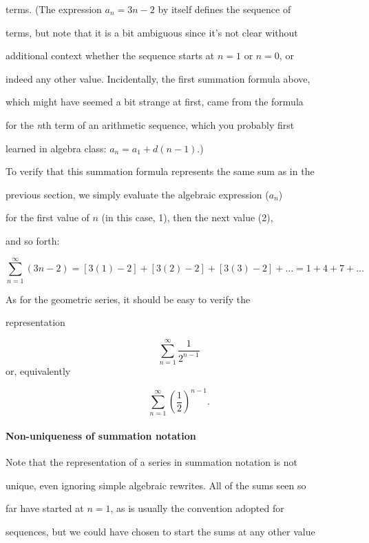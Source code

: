 terms. (The expression $a _n=3n-2$ by itself defines the sequence of

terms, but note that it is a bit ambiguous since it's not clear without

additional context whether the sequence starts at $n=1$ or $n=0$, or

indeed any other value. Incidentally, the first summation formula above,

which might have seemed a bit strange at first, came from the formula

for the \textit{n}th term of an arithmetic sequence, which you probably first

learned in algebra class: $a _n=a _1+d(n-1)$.)



To verify that this summation formula represents the same sum as in the

previous section, we simply evaluate the algebraic expression ($a _n$)

for the first value of $n$ (in this case, 1), then the next value (2),

and so forth:



$$\sum _{n=1}^{\infty} (3n-2) = [3(1)-2]+[3(2)-2]+[3(3)-2]+\ldots = 1+4+7+\ldots$$



As for the geometric series, it should be easy to verify the

representation



$$\sum _{n=1}^{\infty} \frac{1}{2^{n-1}}$$ or, equivalently



$$\sum _{n=1}^{\infty} \left(\frac{1}{2}\right)^{n-1}.$$



\paragraph{Non-uniqueness of summation notation}



Note that the representation of a series in summation notation is not

unique, even ignoring simple algebraic rewrites. All of the sums seen so

far have started at $n=1$, as is usually the convention adopted for

sequences, but we could have chosen to start the sums at any other value

